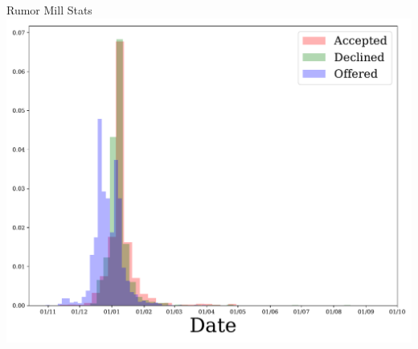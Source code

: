 \documentclass[10pt]{beamer}
\begin{document}
\begin{frame}{Rumor Mill Stats}
\includegraphics[width=\textwidth]{../Distribution.pdf}
\end{frame}
\end{document}
